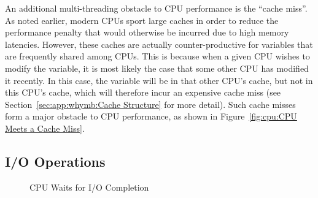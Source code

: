 An additional multi-threading obstacle to CPU performance is
the ``cache miss''.
As noted earlier, modern CPUs sport large caches in order to reduce the
performance penalty that would otherwise be incurred due to high memory
latencies.
However, these caches are actually counter-productive for variables that
are frequently shared among CPUs.
This is because when a given CPU wishes to modify the variable, it is
most likely the case that some other CPU has modified it recently.
In this case, the variable will be in that other CPU's cache, but not
in this CPU's cache, which will therefore incur an expensive cache miss
(see Section~\ref{sec:app:whymb:Cache Structure} for more detail).
Such cache misses form a major obstacle to CPU performance, as shown
in Figure~\ref{fig:cpu:CPU Meets a Cache Miss}.

\QuickQuizEnd

\subsection{I/O Operations}
\label{sec:cpu:I/O Operations}

\begin{figure}[tb]
\centering
{}
\caption{CPU Waits for I/O Completion}
\end{figure}

